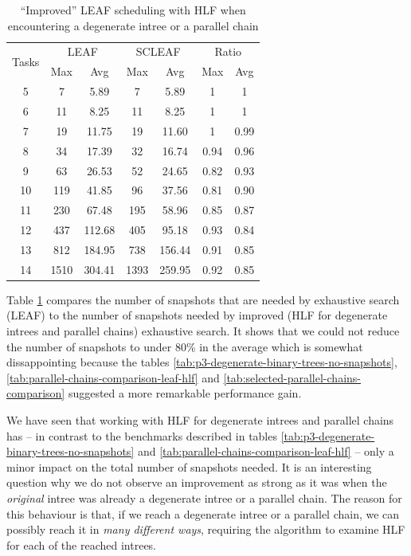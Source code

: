 \begin{table}[th]
  \centering
  \begin{tabular}[ht]{ccccccc}
    \multirow{2}{*}{Tasks} & \multicolumn{2}{c}{LEAF} & \multicolumn{2}{c}{SCLEAF} & \multicolumn{2}{c}{Ratio}\\
    &  Max & Avg & Max & Avg & Max & Avg\\
    \hline
    5 & 7 & 5.89 & 7 & 5.89 & 1 & 1\\
    6 & 11 & 8.25 & 11 & 8.25 & 1 & 1\\
    7 & 19 & 11.75 & 19 & 11.60 & 1 & 0.99 \\
    8 & 34 & 17.39 & 32 & 16.74 & 0.94 & 0.96 \\
    9 & 63 & 26.53 & 52 & 24.65 & 0.82 & 0.93 \\
    10 & 119 & 41.85 & 96 & 37.56 &0.81 & 0.90 \\
    11 & 230 & 67.48 & 195 & 58.96 & 0.85 & 0.87 \\
    12 & 437 & 112.68 & 405 & 95.18 & 0.93 & 0.84 \\
    13 & 812 & 184.95 & 738 & 156.44 & 0.91 & 0.85 \\
    14 & 1510 & 304.41 &1393 & 259.95 & 0.92 & 0.85
  \end{tabular}
  \caption{``Improved'' LEAF scheduling with HLF when encountering a degenerate intree or a parallel chain}
  \label{tab:improving-leaf-scheduler-benchmark}
\end{table}

Table \ref{tab:improving-leaf-scheduler-benchmark} compares the number of snapshots that are needed by exhaustive search (LEAF) to the number of snapshots needed by improved (HLF for degenerate intrees and parallel chains) exhaustive search. It shows that we could not reduce the number of snapshots to under 80\% in the average which is somewhat dissappointing because the tables \ref{tab:p3-degenerate-binary-trees-no-snapshots}, \ref{tab:parallel-chains-comparison-leaf-hlf} and \ref{tab:selected-parallel-chains-comparison} suggested a more remarkable performance gain.

We have seen that working with HLF for degenerate intrees and parallel chains has -- in contrast to the benchmarks described in tables \ref{tab:p3-degenerate-binary-trees-no-snapshots} and \ref{tab:parallel-chains-comparison-leaf-hlf} -- only a minor impact on the total number of snapshots needed. It is an interesting question why we do not observe an improvement as strong as it was when the \emph{original} intree was already a degenerate intree or a parallel chain. The reason for this behaviour is that, if we reach a degenerate intree or a parallel chain, we can possibly reach it in \emph{many different ways}, requiring the algorithm to examine HLF for each of the reached intrees. 

